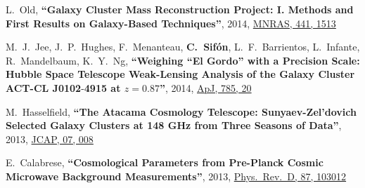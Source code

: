 \documentclass{article}
\def\myself{\textbf{\color{red} C.~Sif\'on}}
\def\apj{ApJ}
\def\jcap{JCAP}
\def\mnras{MNRAS}
\def\prd{Phys.\ Rev.\ D}
\newcommand{\paper}[1]{\textbf{``#1''}}
\begin{document}
\begin{etaremune}
\item
L.~Old, 
\paper{Galaxy Cluster Mass Reconstruction Project: I. Methods and First Results on Galaxy-Based 
Techniques},
2014, \href{http://adsabs.harvard.edu/adsabs/abs/2014MNRAS.441.1513O}{\mnras, 441, 1513}

\item
M.~J.~Jee, J.~P.~Hughes, F.~Menanteau, \myself, L.~F.~Barrientos, L.~Infante, R.~Mandelbaum, 
K.~Y.~Ng,
\paper{Weighing ``El Gordo'' with a Precision Scale: Hubble Space Telescope Weak-Lensing Analysis
of the Galaxy Cluster ACT-CL J0102$\textbf{-}$4915 at $z=0.87$},
2014, \href{http://adsabs.harvard.edu/adsabs/abs/2014ApJ...785...20J}{\apj, 785, 20}

\item
M.~Hasselfield, 
\paper{The Atacama Cosmology Telescope: Sunyaev-Zel'dovich Selected Galaxy Clusters at 148 GHz from 
Three Seasons of Data},
2013, \href{http://adsabs.harvard.edu/adsabs/abs/2013arXiv1301.0816H}{\jcap, 07, 008}

\item
E.~Calabrese, 
\paper{Cosmological Parameters from Pre-Planck Cosmic Microwave Background Measurements},
2013, \href{http://adsabs.harvard.edu/adsabs/abs/2013arXiv1302.1841C}{\prd, 87, 103012}


\end{etaremune}
\end{document}
